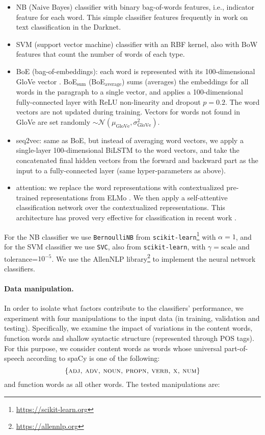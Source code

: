 \documentclass[11pt,a4paper,table]{article}
\begin{document}
\begin{itemize}
  \item NB (Naive Bayes) classifier
    with binary bag-of-words features, i.e., indicator feature for each word. This simple classifier
    features  frequently in work on text classification in the Darknet.
  \item SVM (support vector machine) classifier with an RBF kernel,
  also with BoW features that count the number of words of each type.
  \item BoE (bag-of-embeddings): each word is represented with its 100-dimensional
  GloVe vector \cite{pennington2014glove}. BoE$_\mathrm{sum}$ (BoE$_\mathrm{average}$) sums (averages) 
  the embeddings for all words in the paragraph to a single vector, and applies a 100-dimensional fully-connected layer with
  ReLU non-linearity and dropout $p=0.2$. The word vectors are not updated during training.
  Vectors for words not found in GloVe are set randomly
  $\sim\mathcal{N}(\mu_\textrm{GloVe},\sigma^2_\textrm{GloVe})$.
  \item seq2vec: same as BoE, but instead of averaging word vectors,
  we apply a single-layer 100-dimensional BiLSTM to the word vectors, and take the concatenated
  final hidden vectors from the forward and backward part as the input to a
  fully-connected layer (same hyper-parameters as above).
  \item attention: we replace the word representations with contextualized
  pre-trained representations from ELMo \cite{Peters:2018}. We then apply a self-attentive
  classification network \cite{mccann2017learned} over the contextualized representations. This architecture has proved very effective for classification in
  recent work \cite{W18-5427,D18-1401}.
\end{itemize}

For the NB classifier we use \texttt{BernoulliNB} from
\texttt{scikit-learn}\footnote{\url{https://scikit-learn.org}}
with $\alpha=1$,
and for the SVM classifier we use \texttt{SVC}, also from \texttt{scikit-learn},
with $\gamma=\mathrm{scale}$ and tolerance=$10^{-5}$.
We use the AllenNLP  library\footnote{\url{https://allennlp.org}}
\cite{Gardner2017AllenNLP} to implement the neural network classifiers.

\paragraph{Data manipulation.}

In order to isolate what factors contribute to the classifiers' performance,
we experiment with four manipulations to the input
data (in training, validation and testing).
Specifically, we examine the impact of variations in the content words, function words and shallow syntactic structure (represented through POS tags).
For this purpose, we consider content words as words whose universal part-of-speech
according to spaCy is one of the following:
\[\{\textsc{adj, adv, noun, propn, verb, x, num}\}\]
and function words as all other words.
The tested manipulations are:
\end{document}
